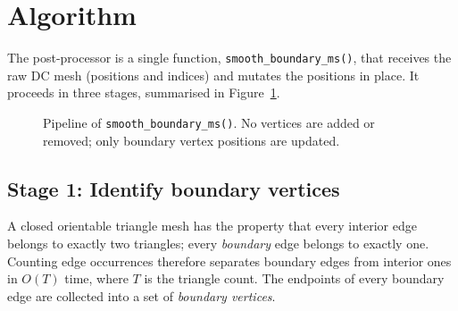 \documentclass[11pt]{article}
\begin{document}
\section{Algorithm}

The post-processor is a single function,
\texttt{smooth\_boundary\_ms()}, that receives the raw DC mesh
(positions and indices) and mutates the positions in place.  It proceeds
in three stages, summarised in Figure~\ref{fig:flow}.

\begin{figure}[h]
  \centering
  \caption{\label{fig:flow} Pipeline of \texttt{smooth\_boundary\_ms()}.
    No vertices are added or removed; only boundary vertex positions are
    updated.}
\end{figure}

\subsection{Stage 1: Identify boundary vertices}

A closed orientable triangle mesh has the property that every interior
edge belongs to exactly two triangles; every \emph{boundary} edge belongs
to exactly one.  Counting edge occurrences therefore separates boundary
edges from interior ones in $O(T)$ time, where $T$ is the triangle count.
The endpoints of every boundary edge are collected into a set of
\emph{boundary vertices}.
\end{document}
